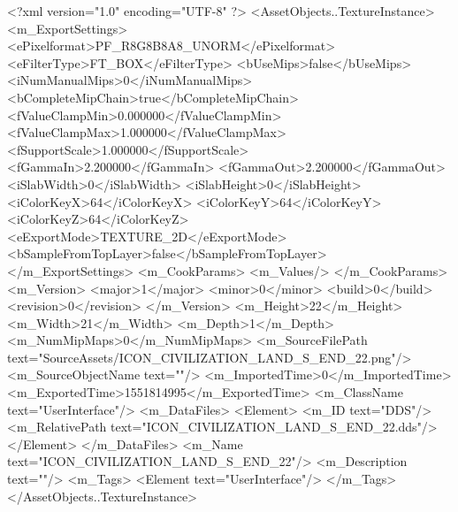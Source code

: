 <?xml version="1.0" encoding="UTF-8" ?>
<AssetObjects..TextureInstance>
	<m_ExportSettings>
		<ePixelformat>PF_R8G8B8A8_UNORM</ePixelformat>
		<eFilterType>FT_BOX</eFilterType>
		<bUseMips>false</bUseMips>
		<iNumManualMips>0</iNumManualMips>
		<bCompleteMipChain>true</bCompleteMipChain>
		<fValueClampMin>0.000000</fValueClampMin>
		<fValueClampMax>1.000000</fValueClampMax>
		<fSupportScale>1.000000</fSupportScale>
		<fGammaIn>2.200000</fGammaIn>
		<fGammaOut>2.200000</fGammaOut>
		<iSlabWidth>0</iSlabWidth>
		<iSlabHeight>0</iSlabHeight>
		<iColorKeyX>64</iColorKeyX>
		<iColorKeyY>64</iColorKeyY>
		<iColorKeyZ>64</iColorKeyZ>
		<eExportMode>TEXTURE_2D</eExportMode>
		<bSampleFromTopLayer>false</bSampleFromTopLayer>
	</m_ExportSettings>
	<m_CookParams>
		<m_Values/>
	</m_CookParams>
	<m_Version>
		<major>1</major>
		<minor>0</minor>
		<build>0</build>
		<revision>0</revision>
	</m_Version>
	<m_Height>22</m_Height>
	<m_Width>21</m_Width>
	<m_Depth>1</m_Depth>
	<m_NumMipMaps>0</m_NumMipMaps>
	<m_SourceFilePath text="SourceAssets/ICON_CIVILIZATION_LAND_S_END_22.png"/>
	<m_SourceObjectName text=""/>
	<m_ImportedTime>0</m_ImportedTime>
	<m_ExportedTime>1551814995</m_ExportedTime>
	<m_ClassName text="UserInterface"/>
	<m_DataFiles>
		<Element>
			<m_ID text="DDS"/>
			<m_RelativePath text="ICON_CIVILIZATION_LAND_S_END_22.dds"/>
		</Element>
	</m_DataFiles>
	<m_Name text="ICON_CIVILIZATION_LAND_S_END_22"/>
	<m_Description text=""/>
	<m_Tags>
		<Element text="UserInterface"/>
	</m_Tags>
</AssetObjects..TextureInstance>

